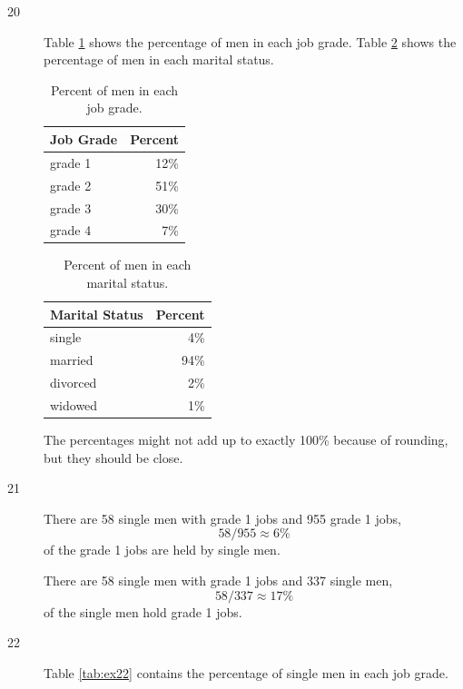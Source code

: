 \documentclass[letterpaper, landscape]{exam}
\begin{document}
\begin{description}
      \item[20] 
        Table \ref{tab:ex20a} shows the percentage of men in each job grade.
        Table \ref{tab:ex20b} shows the percentage of men in each marital status.
        
        \begin{table}[H]
          \centering
          \begin{tabular}{lr}
            \toprule
            Job Grade & Percent \\
            \midrule
            grade 1   & 12\% \\
            grade 2   & 51\% \\
            grade 3   & 30\% \\
            grade 4   & 7\% \\
            \bottomrule
          \end{tabular}
          \caption{Percent of men in each job grade.}
          \label{tab:ex20a}
        \end{table}

        \begin{table}[H]
          \centering
          \begin{tabular}{lr}
            \toprule
            Marital Status & Percent \\
            \midrule
            single         & 4\% \\
            married        & 94\% \\
            divorced       & 2\% \\
            widowed        & 1\% \\
            \bottomrule
          \end{tabular}
          \caption{Percent of men in each marital status.}
          \label{tab:ex20b}
        \end{table}
      The percentages might not add up to exactly 100\% because of rounding, but
      they should be close.
      
    \newpage

    \item[21]
      There are 58 single men with grade 1 jobs and 955 grade 1 jobs, 
      \[
        58/955 \approx 6 \%
      \]
      of the grade 1 jobs are held by single men.

      There are 58 single men with grade 1 jobs and 337 single men, 
      \[
        58/337 \approx 17 \% 
      \]
      of the single men hold grade 1 jobs.

    \item[22]
      Table \ref{tab:ex22} contains the percentage of single men in each job
      grade.


\end{description}
\end{document}

